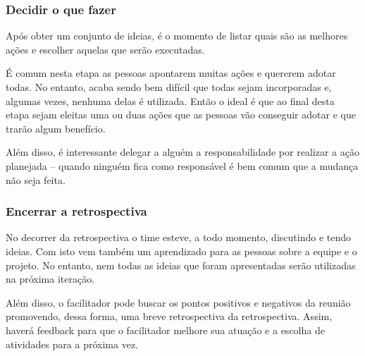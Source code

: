 \subsubsection*{Decidir o que fazer}

Após obter um conjunto de ideias, é o momento de listar quais são as melhores ações e escolher aquelas que serão executadas.

É comum nesta etapa as pessoas apontarem muitas ações e quererem adotar todas. No entanto, acaba sendo bem difícil que todas sejam incorporadas e, algumas vezes, nenhuma delas é utilizada. Então o ideal é que ao final desta etapa sejam eleitas uma ou duas ações que as pessoas vão conseguir adotar e que trarão algum benefício.

Além disso, é interessante delegar a alguém a responsabilidade por realizar a ação planejada -- quando ninguém fica como responsável é bem comum que a mudança não seja feita.

\subsubsection*{Encerrar a retrospectiva}

No decorrer da retrospectiva o time esteve, a todo momento, discutindo e tendo ideias. Com isto vem também um aprendizado para as pessoas sobre a equipe e o projeto. No entanto, nem todas as ideias que foram apresentadas serão utilizadas na próxima iteração.

Além disso, o facilitador pode  buscar os pontos positivos e negativos da reunião promovendo, dessa forma, uma breve retrospectiva da retrospectiva. Assim, haverá feedback para que o facilitador melhore sua atuação e a escolha de atividades para a próxima vez.